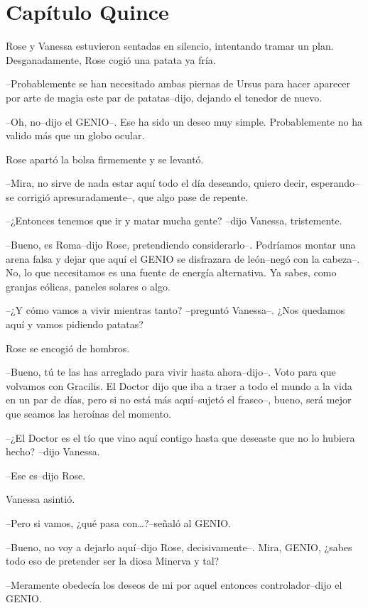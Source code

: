 \chapter*{Capítulo Quince}

Rose y Vanessa estuvieron sentadas en silencio, intentando tramar un
plan. Desganadamente, Rose cogió una patata ya fría.

--Probablemente se han necesitado ambas piernas de Ursus para hacer
aparecer por arte de magia este par de patatas--dijo, dejando el tenedor
de nuevo.

--Oh, no--dijo el GENIO--. Ese ha sido un deseo muy simple.
Probablemente no ha valido más que un globo ocular.

Rose apartó la bolsa firmemente y se levantó.

--Mira, no sirve de nada estar aquí todo el día deseando, quiero decir,
esperando--se corrigió apresuradamente--, que algo pase de repente.

--¿Entonces tenemos que ir y matar mucha gente? --dijo Vanessa,
tristemente.

--Bueno, es Roma--dijo Rose, pretendiendo considerarlo--. Podríamos
montar una arena falsa y dejar que aquí el GENIO se disfrazara de
león--negó con la cabeza--. No, lo que necesitamos es una fuente de
energía alternativa. Ya sabes, como granjas eólicas, paneles solares o
algo.

--¿Y cómo vamos a vivir mientras tanto? --preguntó Vanessa--. ¿Nos
quedamos aquí y vamos pidiendo patatas?

Rose se encogió de hombros.

--Bueno, tú te las has arreglado para vivir hasta ahora--dijo--. Voto
para que volvamos con Gracilis. El Doctor dijo que iba a traer a todo el
mundo a la vida en un par de días, pero si no está más aquí--sujetó el
frasco--, bueno, será mejor que seamos las heroínas del momento.

--¿El Doctor es el tío que vino aquí contigo hasta que deseaste que no
lo hubiera hecho? --dijo Vanessa.

--Ese es--dijo Rose.

Vanessa asintió.

--Pero si vamos, ¿qué pasa con\ldots{}?--señaló al GENIO.

--Bueno, no voy a dejarlo aquí--dijo Rose, decisivamente--. Mira, GENIO,
¿sabes todo eso de pretender ser la diosa Minerva y tal?

--Meramente obedecía los deseos de mi por aquel entonces
controlador--dijo el GENIO.


